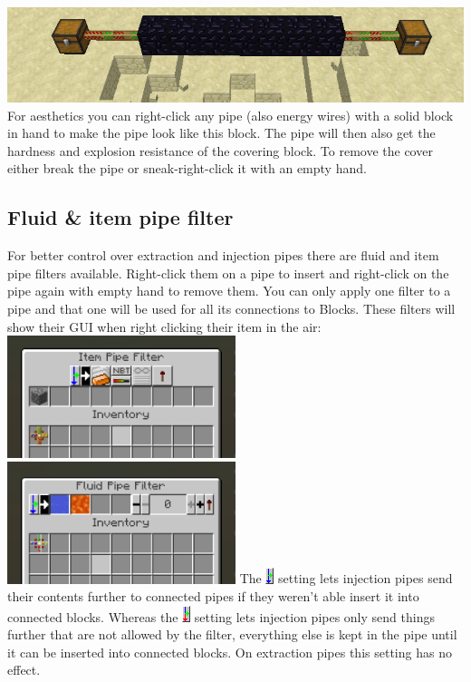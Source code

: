 \documentclass[11pt]{article} %
\begin{document}
\includegraphics[width = \textwidth]{pipeCovered}
For aesthetics you can right-click any pipe (also energy wires) with a solid block in hand to make the pipe look like this block. The pipe will then also get the hardness and explosion resistance of the covering block. To remove the cover either break the pipe or sneak-right-click it with an empty hand.

\subsection{Fluid \& item pipe filter}
For better control over extraction and injection pipes there are fluid and item pipe filters available. Right-click them on a pipe to insert and right-click on the pipe again with empty hand to remove them. You can only apply one filter to a pipe and that one will be used for all its connections to Blocks. These filters will show their GUI when right clicking their item in the air: \\
\includegraphics[width = 0.5\textwidth]{itemFilter} \includegraphics[width = 0.5\textwidth]{fluidFilter}
The \includegraphics[align = c]{sendFurtherY} setting lets injection pipes send their contents further to connected pipes if they weren't able insert it into connected blocks. Whereas the \includegraphics[align = c]{sendFurtherN} setting lets injection pipes only send things further that are not allowed by the filter, everything else is kept in the pipe until it can be inserted into connected blocks. On extraction pipes this setting has no effect. \\
\end{document}
